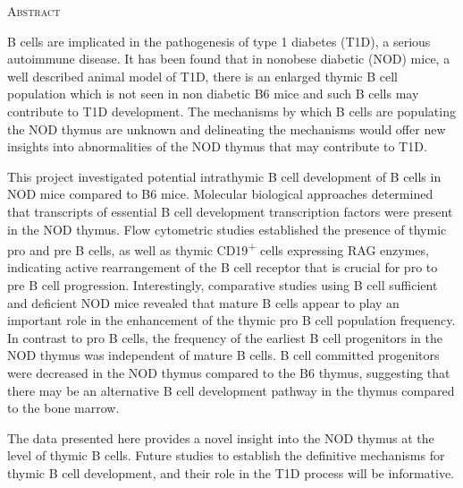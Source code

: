 
\newevenside
\begin{center}
\fontsize{29}{29}\scshape Abstract\\[1cm]
\end{center}

B cells are implicated in the pathogenesis of type 1 diabetes (T1D), a serious autoimmune disease. It has been found that in nonobese diabetic (NOD) mice, a well described animal model of T1D, there is an enlarged thymic B cell population which is not seen in non diabetic B6 mice and such B cells may contribute to T1D development. The mechanisms by which B cells are populating the NOD thymus are unknown and delineating the mechanisms would offer new insights into abnormalities of the NOD thymus that may contribute to T1D.

This project investigated potential intrathymic B cell development of B cells in NOD mice compared to B6 mice. Molecular biological approaches determined that transcripts of essential B cell development transcription factors were present in the NOD thymus. Flow cytometric studies established the presence of thymic pro and pre B cells, as well as thymic CD19\textsuperscript{+} cells expressing RAG enzymes, indicating active rearrangement of the B cell receptor that is crucial for pro to pre B cell progression.
Interestingly, comparative studies using B cell sufficient and deficient NOD mice revealed that mature B cells appear to play an important role in the enhancement of the thymic pro B cell population frequency. 
In contrast to pro B cells, the frequency of the earliest B cell progenitors in the NOD thymus was independent of mature B cells. B cell committed progenitors were decreased in the NOD thymus compared to the B6 thymus, suggesting that there may be an alternative B cell development pathway in the thymus compared to the bone marrow.

The data presented here provides a novel insight into the NOD thymus at the level of thymic B cells. Future studies to establish the definitive mechanisms for thymic B cell development, and their role in the T1D process will be informative.


